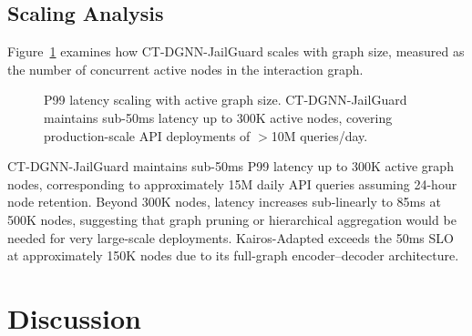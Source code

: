 \documentclass[journal]{IEEEtran}
\theoremstyle{plain}
\theoremstyle{definition}
\theoremstyle{remark}
\begin{document}
\subsection{Scaling Analysis}

Figure~\ref{fig:scaling} examines how CT-DGNN-JailGuard scales with graph size, measured as the number of concurrent active nodes in the interaction graph.

\begin{figure}[t]
\centering
{}
\caption{P99 latency scaling with active graph size. CT-DGNN-JailGuard maintains sub-50ms latency up to 300K active nodes, covering production-scale API deployments of $>$10M queries/day.}
\label{fig:scaling}
\end{figure}

CT-DGNN-JailGuard maintains sub-50ms P99 latency up to 300K active graph nodes, corresponding to approximately 15M daily API queries assuming 24-hour node retention. Beyond 300K nodes, latency increases sub-linearly to 85ms at 500K nodes, suggesting that graph pruning or hierarchical aggregation would be needed for very large-scale deployments. Kairos-Adapted exceeds the 50ms SLO at approximately 150K nodes due to its full-graph encoder--decoder architecture.

\section{Discussion}
\label{sec:discussion}
\end{document}
